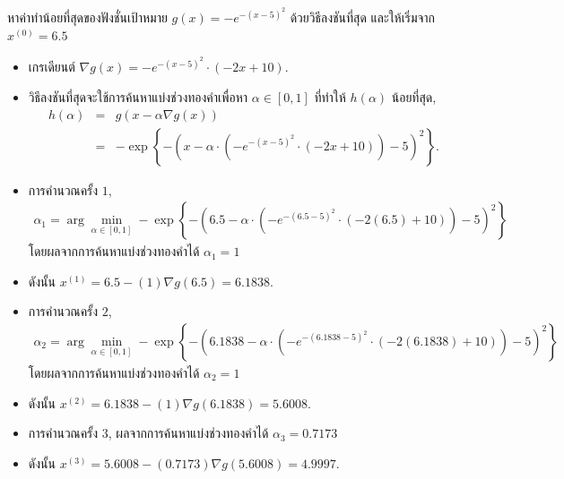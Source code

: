 \begin{myexample}
หาค่าทำน้อยที่สุดของฟังชั่นเป้าหมาย $g(x) = - e^{ - (x-5)^2 }$ ด้วยวิธีลงชันที่สุด และให้เริ่มจาก $x^{(0)} = 6.5$
\begin{itemize}
\item เกรเดียนต์ $\nabla g(x) = - e^{ - (x-5)^2 } \cdot (-2 x + 10)$.
\item วิธีลงชันที่สุดจะใช้การค้นหาแบ่งช่วงทองคำเพื่อหา
 $\alpha \in [0,1]$ ที่ทำให้ $h(\alpha)$ น้อยที่สุด,
\begin{eqnarray}
  h(\alpha) &=& g(x - \alpha \nabla g(x))
\nonumber \\  
  &=& - \exp \left\{ - (x - \alpha \cdot \left(- e^{ - (x-5)^2 } \cdot (-2 x + 10) \right) -5)^2 \right\}.
  \nonumber
\end{eqnarray} 

\item การคำนวณครั้ง $1$, 
\begin{eqnarray}
\alpha_1 = \arg \min_{\alpha \in [0,1]} - \exp \left\{ - (6.5 - \alpha \cdot \left(- e^{ - (6.5-5)^2 } \cdot (-2 (6.5) + 10) \right) -5)^2 \right\}
\nonumber
\end{eqnarray}
 โดยผลจากการค้นหาแบ่งช่วงทองคำได้ $\alpha_1 = 1$
\item ดังนั้น $x^{(1)} = 6.5 - (1) \nabla g(6.5) = 6.1838$.

\item การคำนวณครั้ง $2$, 
\begin{eqnarray}
\alpha_2 = \arg \min_{\alpha \in [0,1]} - \exp \left\{ - (6.1838 - \alpha \cdot \left(- e^{ - (6.1838-5)^2 } \cdot (-2 (6.1838) + 10) \right) -5)^2 \right\}
\nonumber
\end{eqnarray}
 โดยผลจากการค้นหาแบ่งช่วงทองคำได้ $\alpha_2 = 1$
\item ดังนั้น $x^{(2)} = 6.1838 - (1) \nabla g(6.1838) = 5.6008$.

\item การคำนวณครั้ง $3$, 
ผลจากการค้นหาแบ่งช่วงทองคำได้ $\alpha_3 = 0.7173$
\item ดังนั้น $x^{(3)} = 5.6008 - (0.7173) \nabla g(5.6008) = 4.9997$.


\end{itemize}
\end{myexample}
